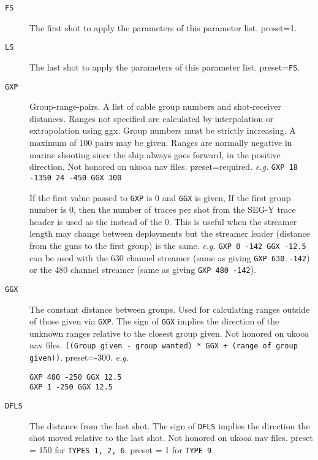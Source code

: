 \begin{description}
\item[\texttt{FS}] The first \gls{shot} to apply the parameters of this parameter list.  \Gls{preset}=1.

\item[\texttt{LS}] The last \gls{shot} to apply the parameters of this parameter list.  \Gls{preset}=\texttt{FS}.

\item[\texttt{GXP}] Group-range-pairs.  A list of cable group numbers and
         shot-receiver distances.  Ranges not specified are calculated
         by interpolation or extrapolation using ggx.  Group numbers must
         be strictly increasing. A maximum of 100 pairs may be given.  Ranges
         are normally negative in marine shooting since the ship always
         goes forward, in the positive direction.
         Not honored on \gls{ukooa} nav files.
         \Gls{preset}=required.    \textit{e.g.} \texttt{GXP 18 -1350 24 -450  GGX 300}

         If the first value passed to \texttt{GXP} is 0 and \texttt{GGX} is given, If the first group number is 0, then the number
         of traces per \gls{shot} from the SEG-Y trace header is used as the
         instead of the 0.  This is useful when the streamer length may
         change between deployments but the streamer leader (distance from
         the guns to the first group) is the same.
         \textit{e.g.}  \texttt{GXP 0 -142 GGX -12.5}  can be used with the 630 channel streamer
         (same as giving \texttt{GXP 630 -142}) or the 480 channel streamer (same as
         giving \texttt{GXP 480 -142}).

\item[\texttt{GGX}] The constant distance between groups.  Used for calculating
         ranges outside of those given via \texttt{GXP}.  The sign of \texttt{GGX} implies
         the direction of the unknown ranges relative to the closest
         group given.  Not honored on \gls{ukooa} nav files.
         \texttt{((Group given - group wanted) * GGX + (range of group given))}.
         \Gls{preset}=-300.
         \textit{e.g.}
\begin{verbatim}
GXP 480 -250 GGX 12.5
GXP 1 -250 GGX 12.5
\end{verbatim}

\item[\texttt{DFLS}] The distance from the last \gls{shot}.  The sign of \texttt{DFLS} implies the
         direction the \gls{shot} moved relative to the last \gls{shot}.
         Not honored on \gls{ukooa} nav files.
         \Gls{preset} = 150 for \texttt{TYPES 1, 2, 6}.
         \Gls{preset} = 1 for \texttt{TYPE 9}.


\end{description}
